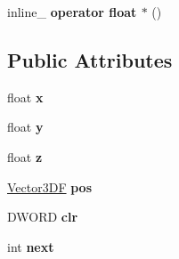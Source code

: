 \begin{DoxyCompactItemize}
\item 
\hypertarget{class_point_ae4c6c9c1103cd5b8f90e2bb0fc260ca3}{inline\+\_\+ {\bfseries operator float $\ast$} ()}\label{class_point_ae4c6c9c1103cd5b8f90e2bb0fc260ca3}

\end{DoxyCompactItemize}
\subsection*{Public Attributes}
\begin{DoxyCompactItemize}
\item 
\hypertarget{class_point_a05dfe2dfbde813ad234b514f30e662f1}{float {\bfseries x}}\label{class_point_a05dfe2dfbde813ad234b514f30e662f1}

\item 
\hypertarget{class_point_a6101960c8d2d4e8ea1d32c9234bbeb8d}{float {\bfseries y}}\label{class_point_a6101960c8d2d4e8ea1d32c9234bbeb8d}

\item 
\hypertarget{class_point_a9a666531e0e99adff132be93d2407d0c}{float {\bfseries z}}\label{class_point_a9a666531e0e99adff132be93d2407d0c}

\item 
\hypertarget{class_point_a7258c69bee8709920873461d50129860}{\hyperlink{class_vector3_d_f}{Vector3\+D\+F} {\bfseries pos}}\label{class_point_a7258c69bee8709920873461d50129860}

\item 
\hypertarget{class_point_af9eb32183f320ab0bccf8deb1efd7f4c}{D\+W\+O\+R\+D {\bfseries clr}}\label{class_point_af9eb32183f320ab0bccf8deb1efd7f4c}

\item 
\hypertarget{class_point_a28901c854ccb7273cabfad1db8c0a460}{int {\bfseries next}}\label{class_point_a28901c854ccb7273cabfad1db8c0a460}

\end{DoxyCompactItemize}

